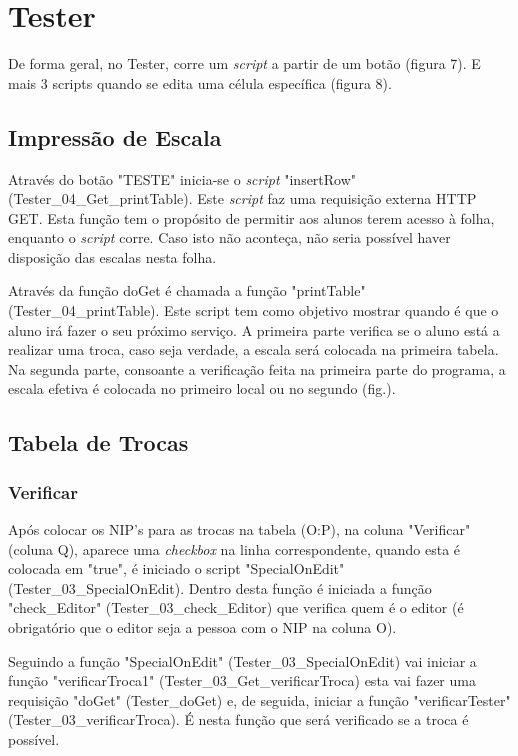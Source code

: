 \graphicspath{{Images/}}

\section{Tester}

De forma geral, no Tester, corre um \textit{script} a partir de um botão (figura 7). E mais 3 scripts quando se edita uma célula específica (figura 8).

\subsection{Impressão de Escala}
Através do botão "TESTE" inicia-se o \textit{script} "insertRow" (Tester\_04\_Get\_printTable). Este \textit{script} faz uma requisição externa HTTP GET. Esta função tem o propósito de permitir aos alunos terem acesso à folha, enquanto o \textit{script} corre. Caso isto não aconteça, não seria possível haver disposição das escalas nesta folha.

Através da função doGet é chamada a função "printTable" (Tester\_04\_printTable). Este script tem como objetivo mostrar quando é que o aluno irá fazer o seu próximo serviço. A primeira parte verifica se o aluno está a realizar uma troca, caso seja verdade, a escala será colocada na primeira tabela. Na segunda parte, consoante a verificação feita na primeira parte do programa, a escala efetiva é colocada no primeiro local ou no segundo (fig.).

\subsection{Tabela de Trocas}

\subsubsection{Verificar}
Após colocar os NIP's para as trocas na tabela (O:P), na coluna "Verificar" (coluna Q), aparece uma \textit{checkbox} na linha correspondente, quando esta é colocada em "true", é iniciado o script "SpecialOnEdit" (Tester\_03\_SpecialOnEdit). Dentro desta função é iniciada a função "check\_Editor" (Tester\_03\_check\_Editor) que verifica quem é o editor (é obrigatório que o editor seja a pessoa com o NIP na coluna O).

\sloppy
Seguindo a função "SpecialOnEdit" (Tester\_03\_SpecialOnEdit) vai iniciar a função "verificarTroca1" (Tester\_03\_Get\_verificarTroca) esta vai fazer uma requisição "doGet" (Tester\_doGet) e, de seguida, iniciar a função "verificarTester" (Tester\_03\_verificarTroca). É nesta função que será verificado se a troca é possível.

